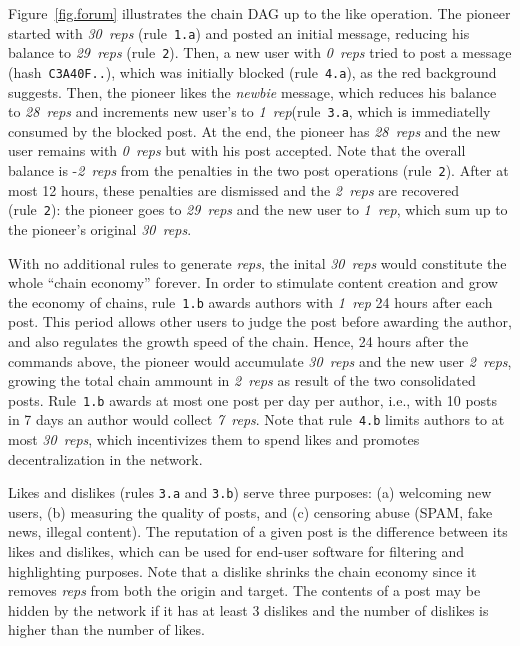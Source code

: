 \documentclass[10pt,journal,compsoc]{IEEEtran}
\newcommand{\reps}     {\emph{reps}\xspace}
\newcommand{\onerep}   {\emph{1~rep}\xspace}
\newcommand{\nreps}[1] {\emph{#1~reps\xspace}}
\begin{document}
Figure~\ref{fig.forum} illustrates the chain DAG up to the like operation.
The pioneer started with \nreps{30} (rule~\texttt{1.a}) and posted an
initial message, reducing his balance to \nreps{29} (rule~\texttt{2}).
Then, a new user with \nreps{0} tried to post a message
(hash~\texttt{C3A40F..}), which was initially blocked (rule~\texttt{4.a}), as
the red background suggests.
Then, the pioneer likes the \emph{newbie} message, which reduces his balance to
\nreps{28} and increments new user's to \onerep (rule~\texttt{3.a}, which is
immediatelly consumed by the blocked post.
At the end, the pioneer has \nreps{28} and the new user remains with \nreps{0}
but with his post accepted.
Note that the overall balance is -\nreps{2} from the penalties in the two post
operations (rule~\texttt{2}).
After at most 12 hours, these penalties are dismissed and the \nreps{2} are
recovered (rule~\texttt{2}):
    the pioneer goes to \nreps{29} and the new user to \onerep, which sum up to
    the pioneer's original \nreps{30}.

With no additional rules to generate \reps, the inital \nreps{30} would
constitute the whole ``chain economy'' forever.
In order to stimulate content creation and grow the economy of chains,
rule~\texttt{1.b} awards authors with \onerep 24 hours after each post.
This period allows other users to judge the post before awarding the author,
and also regulates the growth speed of the chain.
Hence, 24 hours after the commands above, the pioneer would accumulate
\nreps{30} and the new user \nreps{2}, growing the total chain ammount in
\nreps{2} as result of the two consolidated posts.
Rule~\texttt{1.b} awards at most one post per day per author, i.e., with 10
posts in 7 days an author would collect \nreps{7}.
Note that rule~\texttt{4.b} limits authors to at most \nreps{30}, which
incentivizes them to spend likes and promotes decentralization in the network.

Likes and dislikes (rules \texttt{3.a} and \texttt{3.b}) serve three purposes:
    (a) welcoming new users, (b) measuring the quality of posts, and
    (c) censoring abuse (SPAM, fake news, illegal content).
The reputation of a given post is the difference between its likes and
dislikes, which can be used for end-user software for filtering and
highlighting purposes.
Note that a dislike shrinks the chain economy since it removes \reps from both
the origin and target.
The contents of a post may be hidden by the network if it has at least 3
dislikes and the number of dislikes is higher than the number of likes.
\end{document}
